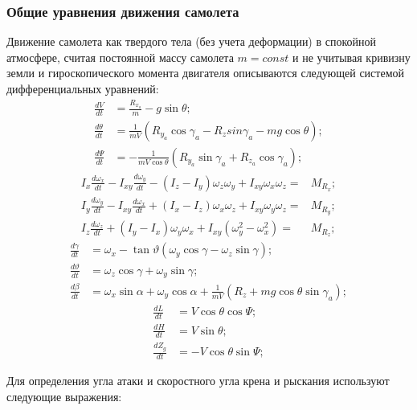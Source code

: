 \documentclass{article}
\begin{document}
\subsubsection{Общие уравнения движения самолета}
Движение самолета как твердого тела (без учета деформации) в спокойной
атмосфере, считая постоянной массу самолета $m=const$ и не учитывая кривизну
земли и гироскопического момента двигателя описываются следующей системой
дифференциальных уравнений:
\begin{align*}
	\frac{dV}{dt}      & = \frac{R_{x_a}}{m} - g \sin{\theta};
	\\
	\frac{d\theta}{dt} & = \frac{1}{mV}(R_{y_a} \cos{\gamma_a} - R_{z}
	sin{\gamma_a} - mg \cos{\theta});                                           \\
	\frac{d\Psi}{dt}   & = -\frac{1}{mV \cos{\theta}} (R_{y_a} \sin{\gamma_a} +
	R_{z_a} \cos{\gamma_a});
\end{align*}
\begin{align*}
	I_x \frac{d\omega_x}{dt} - I_{xy} \frac{d\omega_y}{dt} - (I_z - I_y)
	\omega_z \omega_y + I_{xy} \omega_x \omega_z = & M_{R_x}; \\
	I_y \frac{d\omega_y}{dt} - I_{xy} \frac{d\omega_x}{dt} + (I_x - I_z)
	\omega_x \omega_z + I_{xy} \omega_y \omega_z = & M_{R_y}; \\
	I_z \frac{d\omega_z}{dt} + (I_y - I_x) \omega_y \omega_x +
	I_{xy}(\omega_y^2 - \omega_x^2) =              & M_{R_z};
\end{align*}
\begin{align*}
	\frac{d\gamma}{dt}    & = \omega_x - \tan{\vartheta}(\omega_y \cos{\gamma}
	- \omega_z \sin{\gamma});                                                  \\
	\frac{d\vartheta}{dt} & = \omega_z \cos{\gamma} + \omega_y \sin{\gamma};
	\\
	\frac{d\beta}{dt}     & = \omega_x \sin{\alpha} + \omega_y \cos{\alpha} +
	\frac{1}{mV}(R_z + mg \cos{\theta} \sin{\gamma_a});
\end{align*}
\begin{align*}
	\frac{dL}{dt}   & = V\cos{\theta} \cos{\Psi};    \\
	\frac{dH}{dt}   & = V\sin{\theta};               \\
	\frac{dZ_g}{dt} & = - V \cos{\theta} \sin{\Psi};
\end{align*}

Для определения угла атаки и скоростного угла крена и рыскания используют
следующие выражения:
\end{document}

